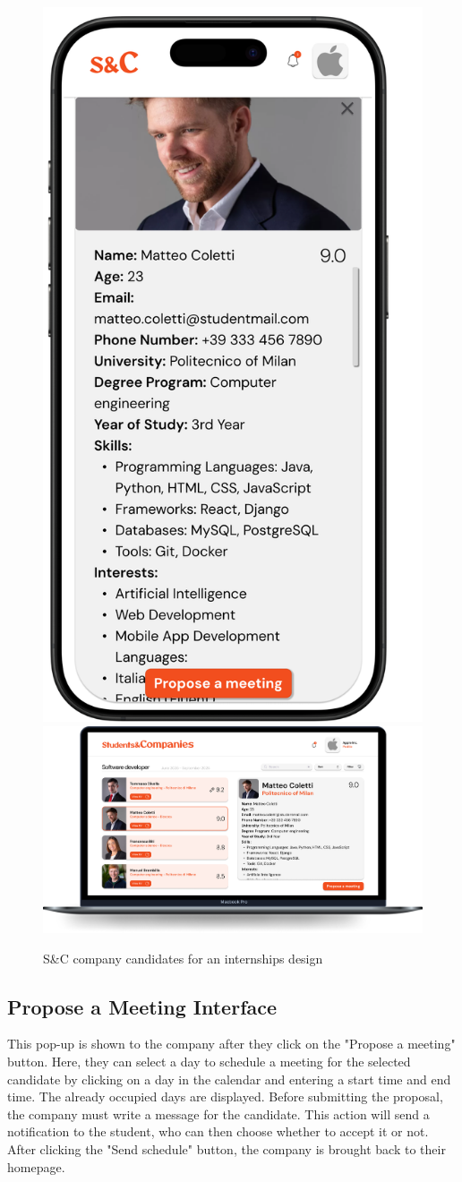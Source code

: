 \begin{figure}[H]
    \centering
    \includegraphics[width=0.2\linewidth]{Images/Mock-up/CandidateDetailsMobile.png}
    \includegraphics[width=0.75\linewidth]{Images/Mock-up/CandidateDetailsPC.png}
    \caption{S\&C company candidates for an internships design}
    \label{fig:homepage-design}
\end{figure}

\subsection{Propose a Meeting Interface}

This pop-up is shown to the company after they click on the "Propose a meeting" button. Here, they can select a day to schedule a meeting for the selected candidate by clicking on a day in the calendar and entering a start time and end time. The already occupied days are displayed. Before submitting the proposal, the company must write a message for the candidate. This action will send a notification to the student, who can then choose whether to accept it or not. After clicking the "Send schedule" button, the company is brought back to their homepage. \\

